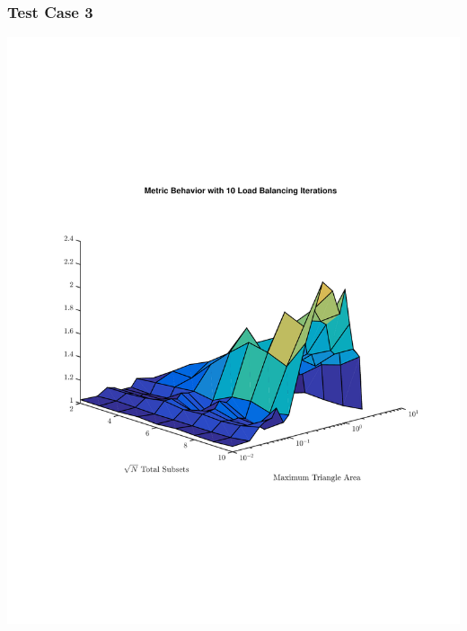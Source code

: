 \documentclass[]{beamer}
\begin{document}
\begin{frame}[t]\frametitle{Test Case 3}
\includegraphics[scale=0.47, trim = 0cm 8cm 0cm 7cm]{figures/lattice_iter.pdf}
\end{frame}
\end{document}

